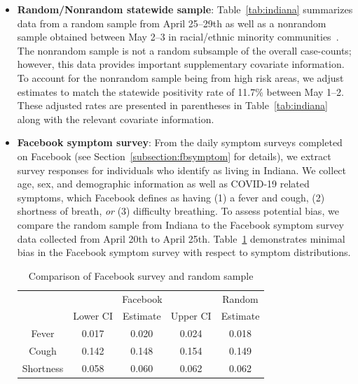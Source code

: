 \documentclass[11pt]{amsart}
\numberwithin{equation}{section}
\theoremstyle{plain}
\begin{document}
\begin{itemize}[leftmargin=*]
\item {\bf Random/Nonrandom statewide sample}: Table~\ref{tab:indiana} summarizes data from a random sample from April 25--29th as well as a nonrandom sample obtained between May 2--3 in racial/ethnic minority communities~\cite{Yiannoutsos2021}. The nonrandom sample is not a random subsample of the overall case-counts; however, this data provides important supplementary covariate information.
To account for the nonrandom sample being from high risk areas, we adjust estimates to match the statewide positivity rate of 11.7\% between May 1--2. These adjusted rates are presented in parentheses in Table~\ref{tab:indiana} along with the relevant covariate information.

\item {\bf Facebook symptom survey}: From the daily symptom surveys completed on Facebook (see Section~\ref{subsection:fbsymptom} for details), we extract survey responses for individuals who identify as living in Indiana.  We collect age, sex, and demographic information as well as COVID-19 related symptoms, which Facebook defines as having (1) a fever and cough, (2) shortness of breath, \emph{or} (3) difficulty breathing. To assess potential bias, we compare the random sample from Indiana to the Facebook symptom survey data collected from April 20th to April 25th.  Table~\ref{tab:comparison} demonstrates minimal bias in the Facebook symptom survey with respect to symptom distributions.

\begin{table}[!th]
\centering
\begin{tabular}{c | c c c | c}
& \multicolumn{3}{c}{Facebook} & Random \\ \cline{2-5}
& Lower CI & Estimate & Upper CI & Estimate \\ \hline
Fever &  0.017 & 0.020 & 0.024 & 0.018 \\
Cough &  0.142 & 0.148 & 0.154 & 0.149 \\
Shortness & 0.058 & 0.060 & 0.062 & 0.062 \\ \hline
\end{tabular}
\caption{Comparison of Facebook survey and random sample}
\label{tab:comparison}
\end{table}



\end{itemize}
\end{document}
